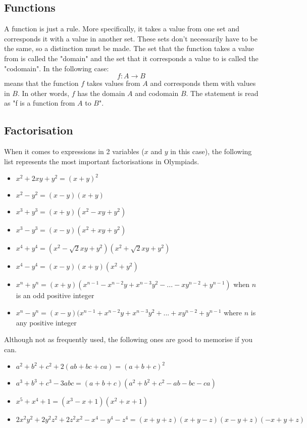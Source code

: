 \documentclass[a4paper,12pt]{article}
\begin{document}
\subsection{Functions}
A function is just a rule. More specifically, it takes a value from one set and corresponds it with a value in another set. These sets don't necessarily have to be the same, so a distinction must be made. The set that the function takes a value from is called the "domain" and the set that it corresponds a value to is called the "codomain". In the following case:
$$f:A \rightarrow B$$
means that the function $f$ takes values from $A$ and corresponds them with values in $B$. In other words, $f$ has the domain $A$ and codomain $B$. The statement is read as "f is a function from $A$ to $B$".

\subsection{Factorisation}
When it comes to expressions in 2 variables ($x$ and $y$ in this case), the following list represents the most important factorisations in Olympiads.

\begin{itemize}

\item $x^2 + 2xy + y^2 = (x + y) ^ 2$ 
\item $x^2 - y^2 = (x - y)(x + y)$
\item $x^3 + y^3 = (x + y)(x^2 - xy + y^2)$
\item $x^3 - y^3 = (x - y)(x^2 + xy + y^2)$
\item $x^4 + y^4 = (x^2 - \sqrt{2}xy + y^2)(x^2 + \sqrt{2}xy + y^2)$
\item $x^4 - y^4 = (x - y)(x + y)(x^2 + y^2)$
\item $x^n + y^n = (x + y)(x^{n - 1} - x^{n - 2}y + x^{n - 3}y^2 - ... - xy^{n - 2} + y^{n - 1})$ when $n$ is an odd positive integer
\item $x^n - y^n = (x - y)(x^{n - 1} + x^{n - 2}y + x^{n - 3}y^2 + ... + xy^{n - 2} + y^{n - 1}$ where $n$ is any positive integer

\end{itemize}

Although not as frequently used, the following ones are good to memorise if you can.

\begin{itemize}

\item $a^2 + b^2 + c^2 + 2(ab + bc + ca) = (a + b + c)^2$
\item $a^3 + b^3 + c^3 - 3abc = (a + b + c)(a^2 + b^2 + c^2 - ab - bc - ca)$
\item $x^5 + x^4 + 1 = (x^3 - x + 1)(x^2 + x + 1)$
\item $2x^2y^2 + 2y^2z^2 + 2z^2x^2 - x^4 - y^4 - z^4 = (x + y + z)(x + y - z)(x - y + z)(-x + y + z)$

\end{itemize}
\end{document}
